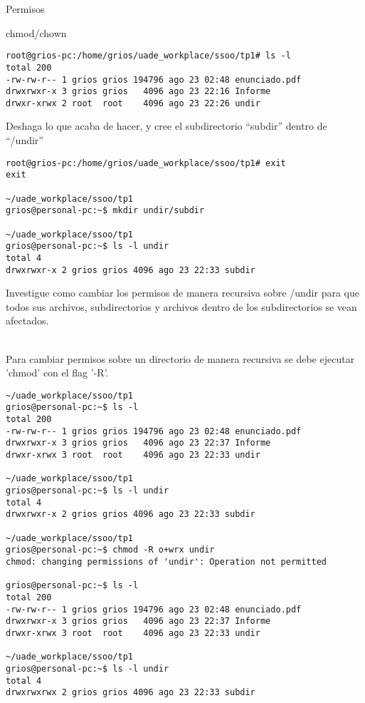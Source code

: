 \begin{section}{Permisos}
\begin{subsection}{chmod/chown}
\begin{lstlisting}[style=Ubuntu]
root@grios-pc:/home/grios/uade_workplace/ssoo/tp1# ls -l
total 200
-rw-rw-r-- 1 grios grios 194796 ago 23 02:48 enunciado.pdf
drwxrwxr-x 3 grios grios   4096 ago 23 22:16 Informe
drwxr-xrwx 2 root  root    4096 ago 23 22:26 undir
\end{lstlisting}

\begin{quoting}
Deshaga lo que acaba de hacer, y cree el subdirectorio “subdir” dentro de “/undir”
\end{quoting}
\begin{lstlisting}[style=Ubuntu]
root@grios-pc:/home/grios/uade_workplace/ssoo/tp1# exit
exit

~/uade_workplace/ssoo/tp1
grios@personal-pc:~$ mkdir undir/subdir

~/uade_workplace/ssoo/tp1
grios@personal-pc:~$ ls -l undir 
total 4
drwxrwxr-x 2 grios grios 4096 ago 23 22:33 subdir
\end{lstlisting}

\begin{quoting}
Investigue como cambiar los permisos de manera recursiva sobre /undir para que todos sus
archivos, subdirectorios y archivos dentro de los subdirectorios se vean afectados.
\end{quoting}\\
Para cambiar permisos sobre un directorio de manera recursiva se debe ejecutar 'chmod' con el flag '-R'.

\begin{lstlisting}[style=Ubuntu]
~/uade_workplace/ssoo/tp1
grios@personal-pc:~$ ls -l
total 200
-rw-rw-r-- 1 grios grios 194796 ago 23 02:48 enunciado.pdf
drwxrwxr-x 3 grios grios   4096 ago 23 22:37 Informe
drwxr-xrwx 3 root  root    4096 ago 23 22:33 undir

~/uade_workplace/ssoo/tp1
grios@personal-pc:~$ ls -l undir
total 4
drwxrwxr-x 2 grios grios 4096 ago 23 22:33 subdir

~/uade_workplace/ssoo/tp1
grios@personal-pc:~$ chmod -R o+wrx undir
chmod: changing permissions of 'undir': Operation not permitted

grios@personal-pc:~$ ls -l
total 200
-rw-rw-r-- 1 grios grios 194796 ago 23 02:48 enunciado.pdf
drwxrwxr-x 3 grios grios   4096 ago 23 22:37 Informe
drwxr-xrwx 3 root  root    4096 ago 23 22:33 undir

~/uade_workplace/ssoo/tp1
grios@personal-pc:~$ ls -l undir
total 4
drwxrwxrwx 2 grios grios 4096 ago 23 22:33 subdir

\end{lstlisting}

\end{subsection}

\end{section}